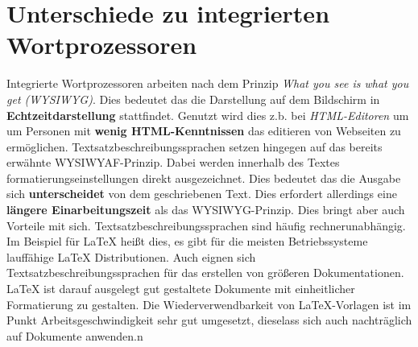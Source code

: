 \section{Unterschiede zu integrierten Wortprozessoren}
Integrierte Wortprozessoren arbeiten nach dem Prinzip \textit{What you see is what you get (WYSIWYG)}. Dies bedeutet das die Darstellung auf dem Bildschirm in \textbf{Echtzeitdarstellung} stattfindet. Genutzt wird dies z.b. bei \textit{HTML-Editoren} um um Personen mit \textbf{wenig HTML-Kenntnissen} das editieren von Webseiten zu ermöglichen.
Textsatzbeschreibungssprachen setzen hingegen auf das bereits erwähnte WYSIWYAF-Prinzip. Dabei werden innerhalb des Textes formatierungseinstellungen direkt ausgezeichnet. Dies bedeutet das die Ausgabe sich \textbf{unterscheidet} von dem geschriebenen Text. Dies erfordert allerdings eine \textbf{längere Einarbeitungszeit} als das WYSIWYG-Prinzip.
Dies bringt aber auch Vorteile mit sich. Textsatzbeschreibungssprachen sind häufig rechnerunabhängig. Im Beispiel für LaTeX heißt dies, es gibt für die meisten Betriebssysteme lauffähige LaTeX Distributionen. Auch eignen sich Textsatzbeschreibungssprachen für das erstellen von größeren Dokumentationen. LaTeX ist darauf ausgelegt gut gestaltete Dokumente mit einheitlicher Formatierung zu gestalten. Die Wiederverwendbarkeit von LaTeX-Vorlagen ist im Punkt Arbeitsgeschwindigkeit sehr gut umgesetzt, dieselass sich auch nachträglich auf Dokumente anwenden.n
